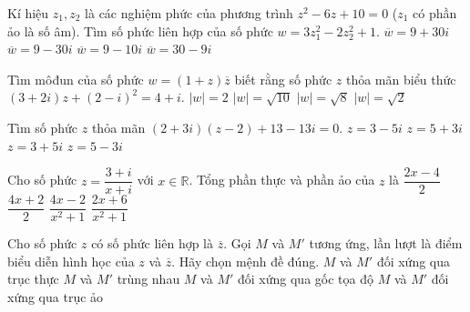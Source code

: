 \begin{ex}%
Kí hiệu $z_1, z_2$ là các nghiệm phức của phương trình $z^2-6z+10=0$ ($z_1$ có phần ảo là số âm). Tìm số phức liên hợp của số phức $w=3z_1^2-2z_2^2+1$.
\choice 
{\True $\overline{w}=9+30i$}
{$\overline{w}=9-30i$}
{$\overline{w}=9-10i$}
{$\overline{w}=30-9i$}  
\end{ex} 

\begin{ex}%
Tìm môđun của số phức $w=(1+z)\overline{z}$ biết rằng số phức $z$ thỏa mãn biểu thức $(3+2i)z+(2-i)^2=4+i$. 
\choice 
{$|w|=2$}
{\True $|w|=\sqrt{10}$}
{$|w|=\sqrt{8}$}
{$|w|=\sqrt{2}$}  
\end{ex} 

\begin{ex}%
Tìm số phức $z$ thỏa mãn $(2+3i)(z-2)+13-13i=0$.
\choice 
{$z=3-5i$}
{$z=5+3i$}
{\True $z=3+5i$}
{$z=5-3i$}  
\end{ex} 

\begin{ex}%
Cho số phức $z=\dfrac{3+i}{x+i}$ với $x \in \mathbb{R}$. Tổng phần thực và phần ảo của $z$ là
\choice 
{$\dfrac{2x-4}{2}$}
{$\dfrac{4x+2}{2}$}
{\True $\dfrac{4x-2}{x^2+1}$}
{$\dfrac{2x+6}{x^2+1}$}  
\end{ex} 

\begin{ex}%
Cho số phức $z$ có số phức liên hợp là $\overline{z}$. Gọi $M$ và $M'$ tương ứng, lần lượt là điểm biểu diễn hình học của $z$ và $\overline{z}$. Hãy chọn mệnh đề đúng. 
\choice 
{\True $M$ và $M'$ đối xứng qua trục thực}
{$M$ và $M'$ trùng nhau}
{$M$ và $M'$ đối xứng qua gốc tọa độ}
{$M$ và $M'$ đối xứng qua trục ảo}  
\end{ex} 

